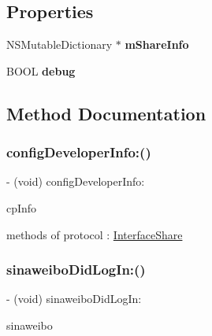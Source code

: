 \subsection*{Properties}
\begin{DoxyCompactItemize}
\item 
\mbox{\label{interfaceShareWeibo_a858dc47e0f587a13260bb3c266313f6d}} 
N\+S\+Mutable\+Dictionary $\ast$ {\bfseries m\+Share\+Info}
\item 
\mbox{\label{interfaceShareWeibo_a97ccb6f76fed8aa54349a2cfca9bb1f5}} 
B\+O\+OL {\bfseries debug}
\end{DoxyCompactItemize}


\subsection{Method Documentation}
\mbox{\label{interfaceShareWeibo_a49d47e5f627464faf1b0afb39d2c984f}} 
\subsubsection{\texorpdfstring{config\+Developer\+Info\+:()}{configDeveloperInfo:()}}
{\footnotesize\ttfamily -\/ (void) config\+Developer\+Info\+: \begin{DoxyParamCaption}\item[{(N\+S\+Mutable\+Dictionary$\ast$)}]{cp\+Info }\end{DoxyParamCaption}}

methods of protocol \+: \hyperlink{classInterfaceShare-p}{Interface\+Share} \mbox{\label{interfaceShareWeibo_a1bfe49872e9be1d507bdb1157777a721}} 
\subsubsection{\texorpdfstring{sinaweibo\+Did\+Log\+In\+:()}{sinaweiboDidLogIn:()}}
{\footnotesize\ttfamily -\/ (void) sinaweibo\+Did\+Log\+In\+: \begin{DoxyParamCaption}\item[{(\hyperlink{interfaceSinaWeibo}{Sina\+Weibo} $\ast$)}]{sinaweibo }\end{DoxyParamCaption}}

